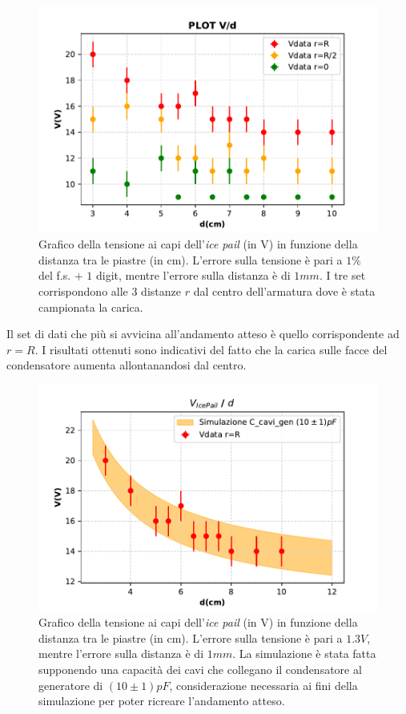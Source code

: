 {\fontsize{12}{14}\selectfont 

\begin{figure}[H]
  \centering
  \includegraphics[width=13.5cm]{Figures/Grafico_Parte3_totale.pdf}
  \caption{Grafico della tensione ai capi dell'\emph{ice pail} (in V) in funzione della distanza tra le piastre (in cm). L'errore sulla tensione è pari a $1\%$ del f.s. + $1$ digit, mentre l'errore sulla distanza è di $1 mm$. I tre set corrispondono alle 3 distanze $r$ dal centro dell'armatura dove è stata campionata la carica.}
  \label{fig:GraficoParteIIITotale}
\end{figure}

Il set di dati che più si avvicina all'andamento atteso è quello corrispondente ad $r = R$. I risultati ottenuti sono indicativi del fatto che la carica sulle facce del condensatore aumenta allontanandosi dal centro.

\begin{figure}[H]
  \centering
  \includegraphics[width=13.5cm]{Figures/Grafico_Parte3.pdf}
  \caption{Grafico della tensione ai capi dell'\emph{ice pail} (in V) in funzione della distanza tra le piastre (in cm). L'errore sulla tensione è pari a $1.3V$, mentre l'errore sulla distanza è di $1 mm$. La simulazione è stata fatta supponendo una capacità dei cavi che collegano il condensatore al generatore di $(10 \pm 1)pF$, considerazione necessaria ai fini della simulazione per poter ricreare l'andamento atteso.}
  \label{fig:GraficoParteIII}
\end{figure}


\par}